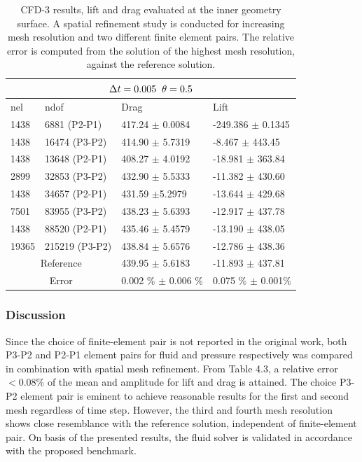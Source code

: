 \begin{table}[h!]
\centering
\label{CFD-32 Results}
 \begin{tabular}{ |p{1cm}||p{2.9cm}|p{3.3cm}|p{3.3cm}|}
  \hline
  \multicolumn{4}{|c|}{$\Delta t = 0.005 \hspace{2mm} \theta = 0.5$} \\
   \hline
nel & ndof & Drag  & Lift \\
\hline
 1438    & 6881  (P2-P1)   &  417.24  $\pm$  0.0084 & -249.386   $\pm$ 0.1345  \\
 1438    & 16474 (P3-P2)   & 414.90     $\pm$  5.7319 & -8.467 $\pm$  443.45  \\
\hline
 1438    &13648  (P2-P1)   & 408.27   $\pm$ 4.0192 & -18.981   $\pm$ 363.84 \\
 2899    &  32853 (P3-P2)   & 432.90      $\pm$  5.5333 & -11.382      $\pm$  430.60 \\
 \hline
 1438    & 34657  (P2-P1)   & 431.59 $\pm$5.2979 & -13.644   $\pm$ 429.68 \\
 7501    & 83955 (P3-P2)  & 438.23      $\pm$  5.6393 & -12.917 $\pm$  437.78 \\
 \hline
 1438    & 88520  (P2-P1)   & 435.46  $\pm$ 5.4579 & -13.190   $\pm$ 438.05 \\
 19365   & 215219 (P3-P2)  & 438.84    $\pm$  5.6576 & -12.786      $\pm$  438.36 \\
\hline
 \multicolumn{2}{|c|}{Reference}  & 439.95 $\pm$ 5.6183 & -11.893 $\pm$ 437.81\\
 \hline
  \multicolumn{2}{|c|}{Error}  & 0.002 \% $\pm$ 0.006 \% & 0.075 \% $\pm$ 0.001\% \\
  \hline
\end{tabular}
\caption{CFD-3 results, lift and drag evaluated at the inner geometry surface. A spatial refinement study is conducted for increasing mesh resolution and two different finite element pairs. The relative error is computed from the solution of the highest mesh resolution, against the reference solution.}
\label{table:cfd32}
\end{table}
\subsubsection*{Discussion}
Since the choice of finite-element pair is not reported in the original work, both P3-P2 and P2-P1 element pairs for fluid and pressure respectively was compared in combination with spatial mesh refinement. From Table 4.3, a relative error $ < 0.08\%$ of the mean and amplitude for lift and drag is attained. The choice P3-P2 element pair is eminent to achieve reasonable results for the first and second mesh regardless of time step.  However, the third and fourth mesh resolution shows close resemblance with the reference solution, independent of finite-element pair. On basis of the presented results, the fluid solver is validated in accordance with the proposed benchmark. 
